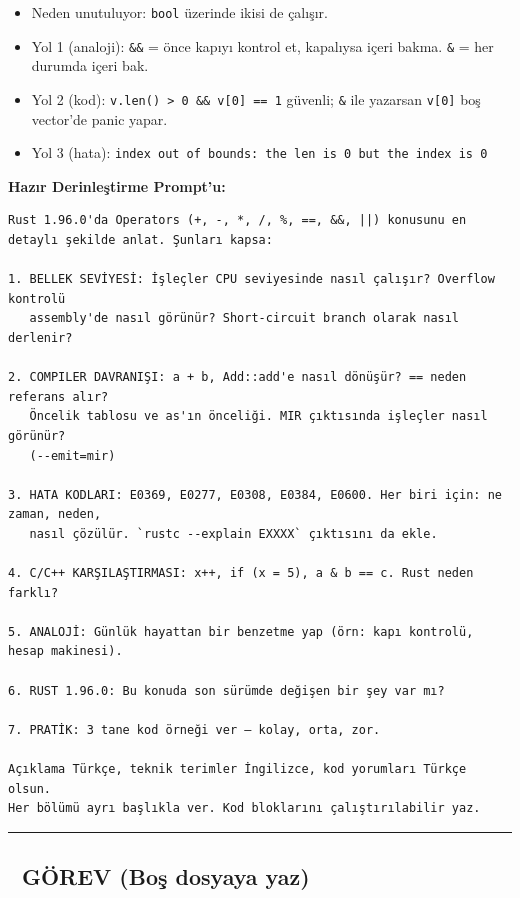 \documentclass[12pt,a4paper]{article}
\begin{document}
\begin{itemize}
\tightlist
\item
  Neden unutuluyor: \texttt{bool} üzerinde ikisi de çalışır.
\item
  Yol 1 (analoji): \texttt{\&\&} = önce kapıyı kontrol et, kapalıysa içeri bakma. \texttt{\&} = her durumda içeri bak.
\item
  Yol 2 (kod): \texttt{v.len()\ \textgreater{}\ 0\ \&\&\ v{[}0{]}\ ==\ 1} güvenli; \texttt{\&} ile yazarsan \texttt{v{[}0{]}} boş vector'de panic yapar.
\item
  Yol 3 (hata): \texttt{index\ out\ of\ bounds:\ the\ len\ is\ 0\ but\ the\ index\ is\ 0}
\end{itemize}

\textbf{Hazır Derinleştirme Prompt'u:}

\begin{verbatim}
Rust 1.96.0'da Operators (+, -, *, /, %, ==, &&, ||) konusunu en detaylı şekilde anlat. Şunları kapsa:

1. BELLEK SEVİYESİ: İşleçler CPU seviyesinde nasıl çalışır? Overflow kontrolü
   assembly'de nasıl görünür? Short-circuit branch olarak nasıl derlenir?

2. COMPILER DAVRANIŞI: a + b, Add::add'e nasıl dönüşür? == neden referans alır?
   Öncelik tablosu ve as'ın önceliği. MIR çıktısında işleçler nasıl görünür?
   (--emit=mir)

3. HATA KODLARI: E0369, E0277, E0308, E0384, E0600. Her biri için: ne zaman, neden,
   nasıl çözülür. `rustc --explain EXXXX` çıktısını da ekle.

4. C/C++ KARŞILAŞTIRMASI: x++, if (x = 5), a & b == c. Rust neden farklı?

5. ANALOJİ: Günlük hayattan bir benzetme yap (örn: kapı kontrolü, hesap makinesi).

6. RUST 1.96.0: Bu konuda son sürümde değişen bir şey var mı?

7. PRATİK: 3 tane kod örneği ver — kolay, orta, zor.

Açıklama Türkçe, teknik terimler İngilizce, kod yorumları Türkçe olsun.
Her bölümü ayrı başlıkla ver. Kod bloklarını çalıştırılabilir yaz.
\end{verbatim}

\begin{center}\rule{0.5\linewidth}{0.5pt}\end{center}

\subsection{📝 GÖREV (Boş dosyaya yaz)}\label{görev-boş-dosyaya-yaz-3}
\end{document}

